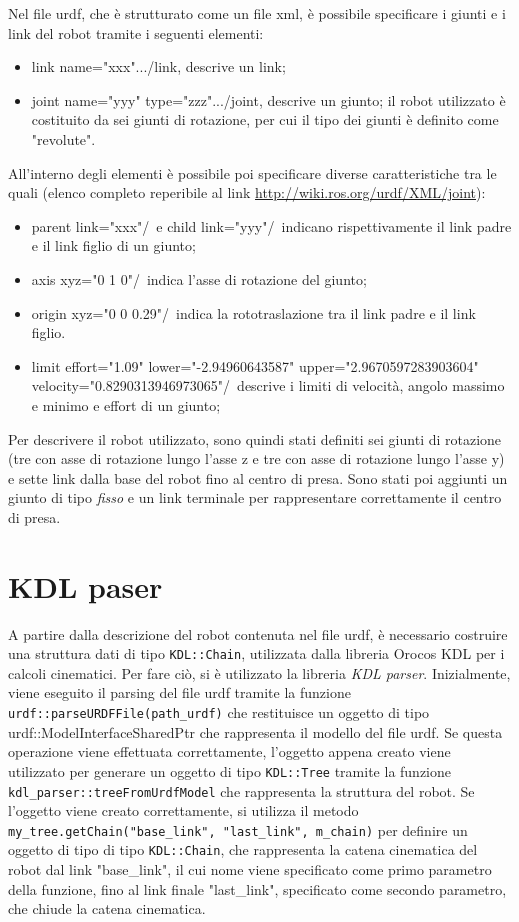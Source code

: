 Nel file urdf, che è strutturato come un file xml, è possibile specificare i giunti e i link del robot tramite i seguenti elementi:
\begin{itemize}
	\item \tl link name="xxx"\tr...\tl /link\tr, descrive un link;
	\item \tl joint name="yyy" type="zzz"\tr...\tl /joint\tr, descrive un giunto; il robot utilizzato è costituito da sei giunti di rotazione, per cui il tipo dei giunti è definito come "revolute".
\end{itemize}
All'interno degli elementi è possibile poi specificare diverse caratteristiche tra le quali (elenco completo reperibile al link \url{http://wiki.ros.org/urdf/XML/joint}):
\begin{itemize}
	\item  \tl parent link="xxx"/\tr\ e \tl child link="yyy"/\tr\ indicano rispettivamente il link padre e il link figlio di un giunto;
	\item \tl axis xyz="0 1 0"/\tr\ indica l'asse di rotazione del giunto;
	\item  \tl origin xyz="0 0 0.29"/\tr\ indica la rototraslazione tra il link padre e il link figlio.
	\item \tl limit effort="1.09" lower="-2.94960643587" upper="2.9670597283903604" velocity="0.8290313946973065"/\tr \ descrive i limiti di velocità, angolo massimo e minimo e effort di un giunto;
\end{itemize}
Per descrivere il robot utilizzato, sono quindi stati definiti sei giunti di rotazione (tre con asse di rotazione lungo l'asse z e tre con asse di rotazione lungo l'asse y) e sette link dalla base del robot fino al centro di presa. Sono stati poi aggiunti un giunto di tipo \textit{fisso} e un link terminale per rappresentare correttamente il centro di presa.

\clearpage

\section{KDL paser}
A partire dalla descrizione del robot contenuta nel file urdf, è necessario costruire una struttura dati di tipo \texttt{KDL::Chain}, utilizzata dalla libreria Orocos KDL per i calcoli cinematici. Per fare ciò, si è utilizzato la libreria \textit{KDL parser}. Inizialmente, viene eseguito il parsing del file urdf tramite la funzione \texttt{urdf::parseURDFFile(path\_urdf)} che restituisce un oggetto di tipo urdf::ModelInterfaceSharedPtr che rappresenta il modello del file urdf. Se questa operazione viene effettuata correttamente, l'oggetto appena creato viene utilizzato per generare un oggetto di tipo \texttt{KDL::Tree} tramite la funzione \texttt{kdl\_parser::treeFromUrdfModel} che rappresenta la struttura del robot. Se l'oggetto viene creato correttamente, si utilizza il metodo \texttt{my\_tree.getChain("base\_link", "last\_link", m\_chain)} per definire un oggetto di tipo di tipo \texttt{KDL::Chain}, che rappresenta la catena cinematica del robot dal link "base\_link", il cui nome viene specificato come primo parametro della funzione, fino al link finale "last\_link", specificato come secondo parametro, che chiude la catena cinematica.

